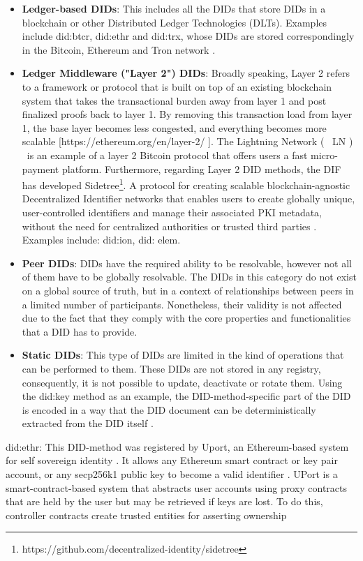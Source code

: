 \begin{itemize}
  \item \textbf{Ledger-based DIDs}: This includes all the DIDs that store DIDs in a blockchain or other Distributed Ledger Technologies (DLTs). Examples include did:btcr, did:ethr and did:trx, whose DIDs are stored correspondingly in the Bitcoin, Ethereum and Tron network \cite{preukschat_reed_2021}.
  \item \textbf{Ledger Middleware ("Layer 2") DIDs}: Broadly speaking, Layer 2 refers to a framework or protocol that is built on top of an existing blockchain system that takes the transactional burden away from layer 1 and post finalized proofs back to layer 1. By removing this transaction load from layer 1, the base layer becomes less congested, and everything becomes more scalable [https://ethereum.org/en/layer-2/ ]. The Lightning Network ( \, LN	) \, is an example of a layer 2 Bitcoin protocol that offers users a fast micro-payment platform. Furthermore, regarding Layer 2 DID methods, the DIF has developed Sidetree\footnote{https://github.com/decentralized-identity/sidetree}. A protocol for creating scalable blockchain-agnostic Decentralized Identifier networks that enables users to create globally unique, user-controlled identifiers and manage their associated PKI metadata, without the need for centralized authorities or trusted third parties \cite{buchner_steele_ronda_2021}.
  Examples include: did:ion, did: elem.
  \item \textbf{Peer DIDs}: DIDs have the required ability to be resolvable, however not all of them have to be globally resolvable. The DIDs in this category do not exist on a global source of truth, but in a context of  relationships between peers in a limited number of participants. Nonetheless, their validity is not affected due to the fact that they comply with the core properties and functionalities that a DID has to provide. 

  \item \textbf{Static DIDs}: This type of DIDs are limited in the kind of operations that can be performed to them. These DIDs are not stored in any registry, consequently, it is not possible to update, deactivate or rotate them. Using the did:key method as an example, the DID-method-specific part of the DID is encoded in a way that the DID document can be deterministically extracted from the DID itself \cite{longley_zagidulin_sporny_2022}.
\end{itemize}


did:ethr:
This DID-method was registered by Uport, an Ethereum-based system for self sovereign identity \cite{Lundkvist_Heck_Torstensson_Mitton_Sena_2016}. It allows any Ethereum smart contract or key pair account, or any secp256k1 public key to become a valid identifier \cite{nistor_grassberger_carlin_2022}. UPort is a smart-contract-based system that abstracts user accounts using proxy contracts that are held by the user but may be retrieved if keys are lost. To do this, controller contracts create trusted entities for asserting ownership \cite{8783188}


